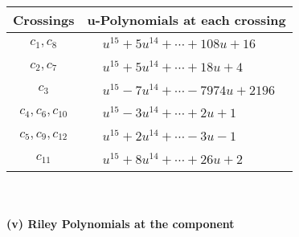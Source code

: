 \documentclass[1p]{elsarticle_modified}
\theoremstyle{definition}
\begin{document}
\begin{tabular}{m{50pt}|m{274pt}}
Crossings & \hspace{64pt}u-Polynomials at each crossing \\
\hline $$\begin{aligned}c_{1},c_{8}\end{aligned}$$&$\begin{aligned}
&u^{15}+5 u^{14}+\cdots+108 u+16
\end{aligned}$\\
\hline $$\begin{aligned}c_{2},c_{7}\end{aligned}$$&$\begin{aligned}
&u^{15}+5 u^{14}+\cdots+18 u+4
\end{aligned}$\\
\hline $$\begin{aligned}c_{3}\end{aligned}$$&$\begin{aligned}
&u^{15}-7 u^{14}+\cdots-7974 u+2196
\end{aligned}$\\
\hline $$\begin{aligned}c_{4},c_{6},c_{10}\end{aligned}$$&$\begin{aligned}
&u^{15}-3 u^{14}+\cdots+2 u+1
\end{aligned}$\\
\hline $$\begin{aligned}c_{5},c_{9},c_{12}\end{aligned}$$&$\begin{aligned}
&u^{15}+2 u^{14}+\cdots-3 u-1
\end{aligned}$\\
\hline $$\begin{aligned}c_{11}\end{aligned}$$&$\begin{aligned}
&u^{15}+8 u^{14}+\cdots+26 u+2
\end{aligned}$\\
\hline
\end{tabular}\\~\\
\newpage\renewcommand{\arraystretch}{1}
\flushleft \textbf{(v) Riley Polynomials at the component}\newline \\
\end{document}
